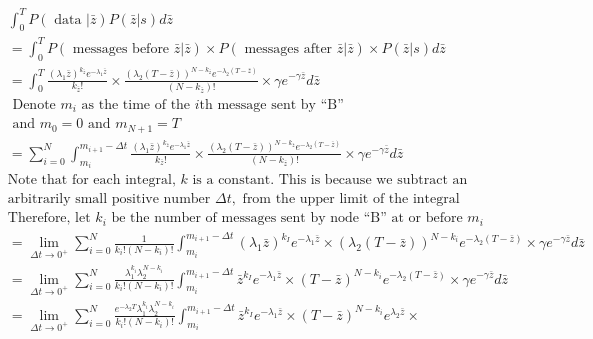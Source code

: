 \documentclass{article}
\begin{document}
\begin{align}
&\int_0^T P( \text{ data } | \bar{z}) P(\bar{z} | s) d\bar{z}  \nonumber \\
&=\int_0^T P( \text{ messages before  } \bar{z} | \bar{z}) \times 
P( \text{ messages after  } \bar{z} | \bar{z})\times  P(\bar{z} | s)d\bar{z} \\
&=\int_0^T   \frac{(\lambda_1\bar{z})^{k_{\bar{z}}}e^{-\lambda_1\bar{z}}}{k_{\bar{z}}!} \times 
                  \frac{(\lambda_2(T- \bar{z}))^{N-k_{\bar{z}}}e^{-\lambda_2(T-\bar{z})}}{(N-k_{\bar{z}})!} \times
                  \gamma e^{-\gamma\bar{z}}d\bar{z} \\
& \text{ Denote } m_i \text{ as the time of the } i \text{th message sent by ``B''}\\
& \text{ and } m_0 =0 \text{ and } m_{N+1} = T \\
& = \sum_{i=0}^N \int_{m_i}^{m_{i+1}-\Delta t}\frac{(\lambda_1\bar{z})^{k_{\bar{z}}}e^{-\lambda_1\bar{z}}}{k_{\bar{z}}!} \times 
                  \frac{(\lambda_2(T- \bar{z}))^{N-k_{\bar{z}}}e^{-\lambda_2(T-\bar{z})}}{(N-k_{\bar{z}})!} \times
                  \gamma e^{-\gamma\bar{z}}d\bar{z} \\
& \text{Note that for each integral, $k$ is a constant.  This is because we subtract an} \nonumber \\
& \text{arbitrarily small positive number } \Delta t, \text{ from the upper limit of the integral} \nonumber \\
& \text{Therefore, let } k_i \text{ be the number of messages sent by node ``B'' at or before } m_i \nonumber\\ 
& = \lim_{\Delta t \to 0^+}  \sum_{i=0}^N \frac{1}{k_i!(N-k_i)!}
                  \int_{m_i}^{m_{i+1}-\Delta t}(\lambda_1\bar{z})^{k_I}e^{-\lambda_1\bar{z}} \times 
                  (\lambda_2(T- \bar{z}))^{N-k_i}e^{-\lambda_2(T-\bar{z})} \times
                  \gamma e^{-\gamma\bar{z}} d\bar{z} \nonumber\\
& = \lim_{\Delta t \to 0^+}  \sum_{i=0}^N \frac{\lambda_1^{k_i}\lambda_2^{N-k_i}}{k_i!(N-k_i)!}
                  \int_{m_i}^{m_{i+1}-\Delta t}\bar{z}^{k_I}e^{-\lambda_1\bar{z}} \times 
                  (T- \bar{z})^{N-k_i}e^{-\lambda_2(T-\bar{z})} \times
                  \gamma e^{-\gamma\bar{z}} d\bar{z} \nonumber\\
& = \lim_{\Delta t \to 0^+}  \sum_{i=0}^N \frac{e^{-\lambda_2 T}\lambda_1^{k_i}\lambda_2^{N-k_i}}{k_i!(N-k_i)!}
                  \int_{m_i}^{m_{i+1}-\Delta t}  \bar{z}^{k_I}e^{-\lambda_1\bar{z}} \times 
                  (T- \bar{z})^{N-k_i}e^{\lambda_2\bar{z}} \times

\end{align}
\end{document}

